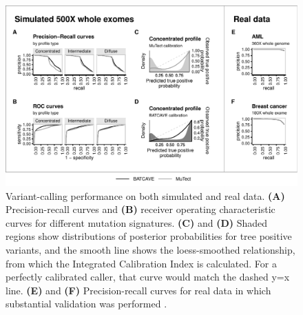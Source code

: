 \documentclass[a4,center,fleqn]{NAR}
\begin{document}

  \begin{figure}
    \begin{center}
    \includegraphics[width=\textwidth]{figures/fig_wes.pdf}
    \end{center}
    \caption{Variant-calling performance on both simulated and real data.
    \textbf{(A)} Precision-recall curves and \textbf{(B)} receiver operating characteristic curves for different mutation signatures.
    \textbf{(C)} and \textbf{(D)} Shaded regions show distributions of posterior probabilities for tree positive variants, and the smooth line shows the loess-smoothed relationship, from which the Integrated Calibration Index is calculated. For a perfectly calibrated caller, that curve would match the dashed y=x line. 
    \textbf{(E)} and \textbf{(F)} Precision-recall curves for real data in which substantial validation was performed \cite{Griffith2015,Shi2018}.}

  \label{NAR-wes_fig}
  \end{figure}
  
\end{document}

